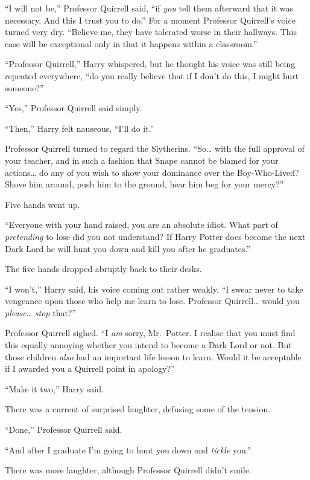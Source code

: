 ``I will not be,'' Professor Quirrell said, ``if \emph{you} tell them
afterward that it was necessary. And this I trust you to do.'' For a
moment Professor Quirrell's voice turned very dry. ``Believe me, they
have tolerated worse in their hallways. This case will be exceptional
only in that it happens within a classroom.''

``Professor Quirrell,'' Harry whispered, but he thought his voice was
still being repeated everywhere, ``do you really believe that if I don't
do this, I might hurt someone?''

``Yes,'' Professor Quirrell said simply.

``Then,'' Harry felt nauseous, ``I'll do it.''

Professor Quirrell turned to regard the Slytherins. ``So\ldots{} with
the full approval of your teacher, and in such a fashion that Snape
cannot be blamed for your actions\ldots{} do any of you wish to show
your dominance over the Boy-Who-Lived? Shove him around, push him to the
ground, hear him beg for your mercy?''

Five hands went up.

``Everyone with your hand raised, you are an absolute idiot. What part
of \emph{pretending} to lose did you not understand? If Harry Potter
does become the next Dark Lord he will hunt you down and kill you after
he graduates.''

The five hands dropped abruptly back to their desks.

``I won't,'' Harry said, his voice coming out rather weakly. ``I swear
never to take vengeance upon those who help me learn to lose. Professor
Quirrell\ldots{} would you \emph{please}\ldots{} \emph{stop} that?''

Professor Quirrell sighed. ``I \emph{am} sorry, Mr.~Potter. I realise
that you must find this equally annoying whether you intend to become a
Dark Lord or not. But those children \emph{also} had an important life
lesson to learn. Would it be acceptable if I awarded you a Quirrell
point in apology?''

``Make it two,'' Harry said.

There was a current of surprised laughter, defusing some of the tension.

``Done,'' Professor Quirrell said.

``And after I graduate I'm going to hunt you down and \emph{tickle}
you.''

There was more laughter, although Professor Quirrell didn't smile.


